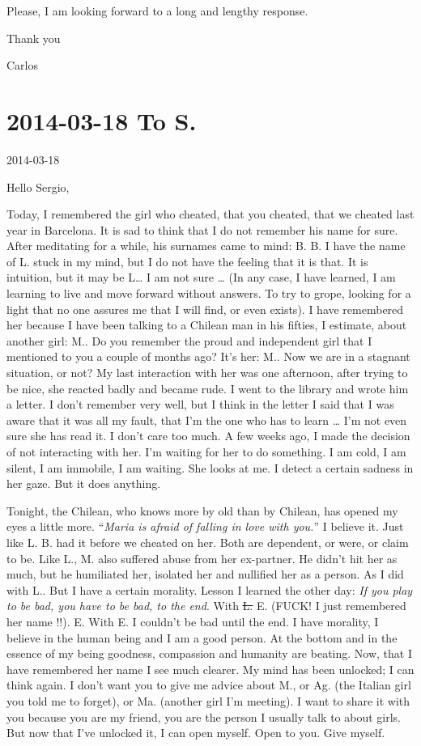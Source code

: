 \documentclass[]{book}
\begin{document}
Please, I am looking forward to a long and lengthy response.

Thank you

Carlos

\hypertarget{toS20140318}{%
\section*{2014-03-18 To S.}\label{toS20140318}}

2014-03-18

Hello Sergio,

Today, I remembered the girl who cheated, that you cheated, that we cheated last year in Barcelona. It is sad to think that I do not remember his name for sure. After meditating for a while, his surnames came to mind: B. B. I have the name of L. stuck in my mind, but I do not have the feeling that it is that. It is intuition, but it may be L\ldots{} I am not sure \ldots{} (In any case, I have learned, I am learning to live and move forward without answers. To try to grope, looking for a light that no one assures me that I will find, or even exists). I have remembered her because I have been talking to a Chilean man in his fifties, I estimate, about another girl: M.. Do you remember the proud and independent girl that I mentioned to you a couple of months ago? It's her: M.. Now we are in a stagnant situation, or not? My last interaction with her was one afternoon, after trying to be nice, she reacted badly and became rude. I went to the library and wrote him a letter. I don't remember very well, but I think in the letter I said that I was aware that it was all my fault, that I'm the one who has to learn \ldots{} I'm not even sure she has read it. I don't care too much. A few weeks ago, I made the decision of not interacting with her. I'm waiting for her to do something. I am cold, I am silent, I am immobile, I am waiting. She looks at me. I detect a certain sadness in her gaze. But it does anything.

Tonight, the Chilean, who knows more by old than by Chilean, has opened my eyes a little more. ``\emph{Maria is afraid of falling in love with you.}'' I believe it. Just like L. B. had it before we cheated on her. Both are dependent, or were, or claim to be. Like L., M. also suffered abuse from her ex-partner. He didn't hit her as much, but he humiliated her, isolated her and nullified her as a person. As I did with L.. But I have a certain morality. Lesson I learned the other day: \emph{If you play to be bad, you have to be bad, to the end}. With \sout{L.} E. (FUCK! I just remembered her name !!). E. With E. I couldn't be bad until the end. I have morality, I believe in the human being and I am a good person. At the bottom and in the essence of my being goodness, compassion and humanity are beating. Now, that I have remembered her name I see much clearer. My mind has been unlocked; I can think again. I don't want you to give me advice about M., or Ag. (the Italian girl you told me to forget), or Ma. (another girl I'm meeting). I want to share it with you because you are my friend, you are the person I usually talk to about girls. But now that I've unlocked it, I can open myself. Open to you. Give myself.
\end{document}
